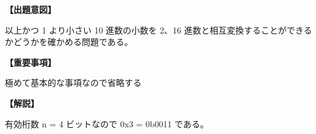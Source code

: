 \noindent \textbf{【出題意図】}

 以上かつ 1 より小さい 10 進数の小数を 2、16 進数と相互変換することができるかどうかを確かめる問題である。

\vspace{1em}
\noindent \textbf{【重要事項】}

\noindent 極めて基本的な事項なので省略する

\vspace{1em}
\noindent \textbf{【解説】}

\noindent 有効桁数 n = 4 ビットなので 0x3 = 0b0011 である。
